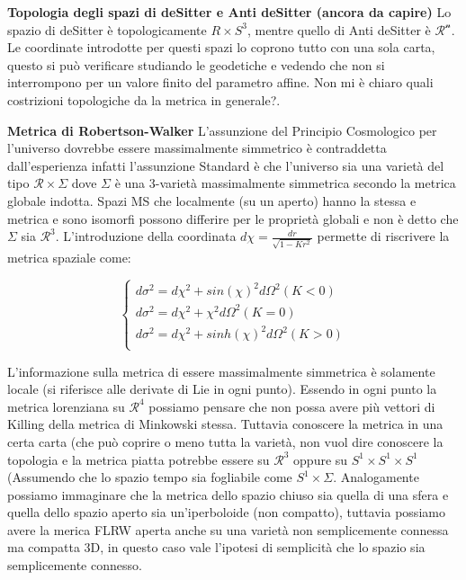 \documentclass[10pt,a4paper]{article}
\begin{document}
\textbf{Topologia degli spazi di deSitter e Anti deSitter (ancora da capire)}
Lo spazio di deSitter è topologicamente $R \times S^3$, mentre quello di Anti deSitter è $\mathcal{R^{n}}$. Le coordinate introdotte per questi spazi lo coprono tutto con una sola carta, questo si può verificare studiando le geodetiche e vedendo che non si interrompono per un valore finito del parametro affine. Non mi è chiaro quali costrizioni topologiche da la metrica in generale?.

\textbf{Metrica di Robertson-Walker}
L'assunzione del Principio Cosmologico per l'universo dovrebbe essere massimalmente simmetrico è contraddetta dall'esperienza infatti l'assunzione Standard è che l'universo sia una varietà del tipo $\mathcal{R} \times \Sigma$ dove $\Sigma$ è una 3-varietà massimalmente simmetrica secondo la metrica globale indotta. Spazi MS che localmente (su un aperto) hanno la stessa e metrica e sono isomorfi possono differire per le proprietà globali e non è detto che $\Sigma$ sia $\mathcal{R^{3}}$. L'introduzione della coordinata $d \chi = \frac{dr}{\sqrt{1-Kr^2}}$ permette di riscrivere la metrica spaziale come:

\begin{equation}
	\begin{cases}
	d \sigma ^ 2 = d \chi^2 + sin(\chi)^2 d \Omega^2 (K < 0)\\
	d \sigma ^ 2 = d \chi^2 + \chi^2 d \Omega^2 (K = 0)\\
	d \sigma ^ 2 = d \chi^2 + sinh(\chi)^2 d \Omega^2 (K > 0)\\	
	\end{cases}
\end{equation}

L'informazione sulla metrica di essere massimalmente simmetrica è solamente locale (si riferisce alle derivate di Lie in ogni punto). Essendo in ogni punto la metrica lorenziana su $\mathcal{R^{4}}$ possiamo pensare che non possa avere più vettori di Killing della metrica di Minkowski stessa. Tuttavia conoscere la metrica in una certa carta (che può coprire o meno tutta la varietà, non vuol dire conoscere la topologia e la metrica piatta potrebbe essere su $\mathcal{R^{3}}$ oppure su $S^{1} \times S^{1} \times S^{1}$ (Assumendo che lo spazio tempo sia fogliabile come $S^{1} \times \Sigma$. Analogamente possiamo immaginare che la metrica dello spazio chiuso sia quella di una sfera e quella dello spazio aperto sia un'iperboloide (non compatto), tuttavia possiamo avere la merica FLRW aperta anche su una varietà non semplicemente connessa ma compatta 3D, in questo caso vale l'ipotesi di semplicità che lo spazio sia semplicemente connesso.
\end{document}
